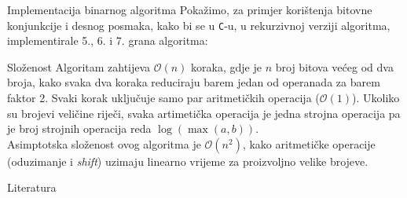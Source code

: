 \documentclass[xcolor=dvipsnames, notheorems]{beamer}
\theoremstyle{plain} %
\theoremstyle{definition} %
\begin{document}
\begin{frame}{Implementacija binarnog algoritma}
Pokažimo, za primjer korištenja bitovne konjunkcije i desnog posmaka, kako bi se u \texttt{C}-u, u rekurzivnoj verziji algoritma, implementirale 5., 6. i 7. grana algoritma: 
 
\end{frame}
 \begin{frame}{Složenost}
 Algoritam zahtijeva $\mathcal{O}(n)$ koraka, gdje je $n$ broj bitova većeg od dva broja, kako svaka dva koraka reduciraju barem jedan od operanada za barem faktor 2. Svaki korak uključuje samo par aritmetičkih operacija ($\mathcal{O}(1)$). Ukoliko su brojevi veličine riječi, svaka artimetička operacija je jedna strojna operacija pa je broj strojnih operacija reda $\log(\max(a,b))$.\\
Asimptotska složenost ovog algoritma je $\boxed{\mathcal{O}(n^2)}$, kako aritmetičke operacije (oduzimanje i \emph{shift}) uzimaju linearno vrijeme za proizvoljno velike brojeve.  
 \end{frame}
 
\begin{frame}{Literatura}
  \printbibliography
  \nocite{*}
\end{frame}
\end{document}
